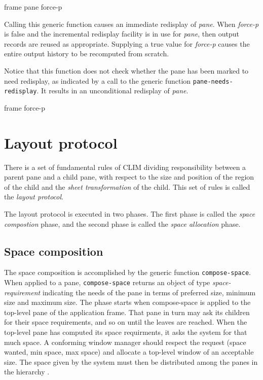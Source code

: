  {frame pane \key force-p}

Calling this generic function causes an immediate redisplay of
\textit{pane}.  When \textit{force-p} is false and the incremental
redisplay facility is in use for \textit{pane}, then output records are
reused as appropriate.  Supplying a true value for \textit{force-p}
causes the entire output history to be recomputed from scratch.

Notice that this function does not check whether the pane has been
marked to need redisplay, as indicated by a call to the generic
function \texttt{pane-needs-redisplay}.  It results in an
unconditional redisplay of \textit{pane}.

 {frame \key force-p}

\section{Layout protocol}

There is a set of fundamental rules of CLIM dividing responsibility
between a parent pane and a child pane, with respect to the size and
position of the region of the child and the \emph{sheet transformation}
of the child.  This set of rules is called the \emph{layout protocol}.

The layout protocol is executed in two phases.  The first phase is
called the \emph{space compostion} phase, and the second phase is
called the \emph{space allocation} phase.

\subsection{Space composition}

The space composition is accomplished by the generic function
\texttt{compose-space}.  When applied to a pane, \texttt{compose-space}
returns an object of type \emph{space-requirement} indicating the needs
of the pane in terms of preferred size, minimum size and maximum size.
The phase starts when compose-space is applied to the top-level pane of
the application frame.  That pane in turn may ask its children for their
space requirements, and so on until the leaves are reached.  When the
top-level pane has computed its space requirments, it asks the system
for that much space.  A conforming window manager should respect the
request (space wanted, min space, max space) and allocate a top-level
window of an acceptable size.  The space given by the system must then
be distributed among the panes in the hierarchy
.

